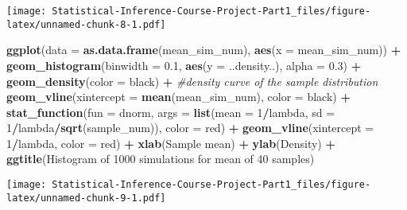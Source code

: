 \documentclass[
]{article}
\newenvironment{Shaded}{\begin{snugshade}}{\end{snugshade}}
\newcommand{\CommentTok}[1]{\textcolor[rgb]{0.56,0.35,0.01}{\textit{#1}}}
\newcommand{\DataTypeTok}[1]{\textcolor[rgb]{0.13,0.29,0.53}{#1}}
\newcommand{\DecValTok}[1]{\textcolor[rgb]{0.00,0.00,0.81}{#1}}
\newcommand{\FloatTok}[1]{\textcolor[rgb]{0.00,0.00,0.81}{#1}}
\newcommand{\KeywordTok}[1]{\textcolor[rgb]{0.13,0.29,0.53}{\textbf{#1}}}
\newcommand{\NormalTok}[1]{#1}
\newcommand{\OperatorTok}[1]{\textcolor[rgb]{0.81,0.36,0.00}{\textbf{#1}}}
\newcommand{\StringTok}[1]{\textcolor[rgb]{0.31,0.60,0.02}{#1}}
\begin{document}
\texttt{[image: Statistical-Inference-Course-Project-Part1\_files/figure-latex/unnamed-chunk-8-1.pdf]}

\begin{Shaded}
\begin{Highlighting}[]
\KeywordTok{ggplot}\NormalTok{(}\DataTypeTok{data =} \KeywordTok{as.data.frame}\NormalTok{(mean\_sim\_num), }\KeywordTok{aes}\NormalTok{(}\DataTypeTok{x =}\NormalTok{ mean\_sim\_num)) }\OperatorTok{+}
\StringTok{        }\KeywordTok{geom\_histogram}\NormalTok{(}\DataTypeTok{binwidth =} \FloatTok{0.1}\NormalTok{, }\KeywordTok{aes}\NormalTok{(}\DataTypeTok{y =}\NormalTok{ ..density..), }\DataTypeTok{alpha =} \FloatTok{0.3}\NormalTok{) }\OperatorTok{+}
\StringTok{        }\KeywordTok{geom\_density}\NormalTok{(}\DataTypeTok{color =} \StringTok{\textquotesingle{}black\textquotesingle{}}\NormalTok{) }\OperatorTok{+}\StringTok{ }\CommentTok{\#density curve of the sample distribution}
\StringTok{        }\KeywordTok{geom\_vline}\NormalTok{(}\DataTypeTok{xintercept =} \KeywordTok{mean}\NormalTok{(mean\_sim\_num), }\DataTypeTok{color =} \StringTok{\textquotesingle{}black\textquotesingle{}}\NormalTok{) }\OperatorTok{+}
\StringTok{        }\KeywordTok{stat\_function}\NormalTok{(}\DataTypeTok{fun =}\NormalTok{ dnorm, }\DataTypeTok{args =} \KeywordTok{list}\NormalTok{(}\DataTypeTok{mean =} \DecValTok{1}\OperatorTok{/}\NormalTok{lambda, }\DataTypeTok{sd =} \DecValTok{1}\OperatorTok{/}\NormalTok{lambda}\OperatorTok{/}\KeywordTok{sqrt}\NormalTok{(sample\_num)), }\DataTypeTok{color =} \StringTok{\textquotesingle{}red\textquotesingle{}}\NormalTok{) }\OperatorTok{+}
\StringTok{        }\KeywordTok{geom\_vline}\NormalTok{(}\DataTypeTok{xintercept =} \DecValTok{1}\OperatorTok{/}\NormalTok{lambda, }\DataTypeTok{color =} \StringTok{\textquotesingle{}red\textquotesingle{}}\NormalTok{) }\OperatorTok{+}
\StringTok{        }\KeywordTok{xlab}\NormalTok{(}\StringTok{\textquotesingle{}Sample mean\textquotesingle{}}\NormalTok{) }\OperatorTok{+}
\StringTok{        }\KeywordTok{ylab}\NormalTok{(}\StringTok{\textquotesingle{}Density\textquotesingle{}}\NormalTok{) }\OperatorTok{+}
\StringTok{        }\KeywordTok{ggtitle}\NormalTok{(}\StringTok{\textquotesingle{}Histogram of 1000 simulations for mean of 40 samples\textquotesingle{}}\NormalTok{)}
\end{Highlighting}
\end{Shaded}

\texttt{[image: Statistical-Inference-Course-Project-Part1\_files/figure-latex/unnamed-chunk-9-1.pdf]}
\end{document}
